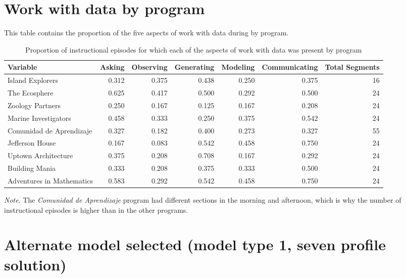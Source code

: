 \documentclass[]{book}
\theoremstyle{definition}
\theoremstyle{definition}
\theoremstyle{definition}
\theoremstyle{remark}
\begin{document}
\section{Work with data by program}\label{work-with-data-by-program}

This table contains the proportion of the five aspects of work with data
during by program.

\begin{landscape}\begin{table}

\caption{\label{tab:unnamed-chunk-17}Proportion of instructional episodes for which each of the aspects of work with data was present by program}
\centering
\begin{tabular}[t]{lrrrrrr}
\toprule
Variable & Asking & Observing & Generating & Modeling & Communicating & Total Segments\\
\midrule
Island Explorers & 0.312 & 0.375 & 0.438 & 0.250 & 0.375 & 16\\
The Ecosphere & 0.625 & 0.417 & 0.500 & 0.292 & 0.500 & 24\\
Zoology Partners & 0.250 & 0.167 & 0.125 & 0.167 & 0.208 & 24\\
Marine Investigators & 0.458 & 0.333 & 0.250 & 0.375 & 0.542 & 24\\
Comunidad de Aprendizaje & 0.327 & 0.182 & 0.400 & 0.273 & 0.327 & 55\\
Jefferson House & 0.167 & 0.083 & 0.542 & 0.458 & 0.750 & 24\\
Uptown Architecture & 0.375 & 0.208 & 0.708 & 0.167 & 0.292 & 24\\
Building Mania & 0.333 & 0.208 & 0.375 & 0.333 & 0.500 & 24\\
Adventures in Mathematics & 0.583 & 0.292 & 0.542 & 0.458 & 0.750 & 24\\
\bottomrule
\end{tabular}
\end{table}
\end{landscape}

\emph{Note}. The \emph{Comunidad de Aprendizaje} program had different
sections in the morning and afternoon, which is why the number of
instructional episodes is higher than in the other programs.

\section{Alternate model selected (model type 1, seven profile
solution)}\label{alternate-model-selected-model-type-1-seven-profile-solution}
\end{document}
